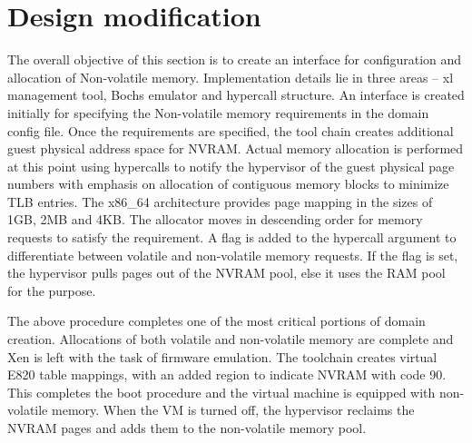 \section{Design modification}
The overall objective of this section is to create an interface for configuration and allocation of Non-volatile memory. Implementation details lie in three areas – xl management tool, Bochs emulator and hypercall structure. An interface is created initially for specifying the Non-volatile memory requirements in the domain config file. Once the requirements are specified, the tool chain creates additional guest physical address space for NVRAM. Actual memory allocation is performed at this point using hypercalls to notify the hypervisor of the guest physical page numbers with emphasis on allocation of contiguous memory blocks to minimize TLB entries. The x86\_64 architecture provides page mapping in the sizes of 1GB, 2MB and 4KB. The allocator moves in descending order for memory requests to satisfy the requirement. A flag is added to the hypercall argument to differentiate between volatile and non-volatile memory requests. If the flag is set, the hypervisor pulls pages out of the NVRAM pool, else it uses the RAM pool for the purpose. 

 

The above procedure completes one of the most critical portions of domain creation. Allocations of both volatile and non-volatile memory are complete and Xen is left with the task of firmware emulation. The toolchain creates virtual E820 table mappings, with an added region to indicate NVRAM with code 90. This completes the boot procedure and the virtual machine is equipped with non-volatile memory. When the VM is turned off, the hypervisor reclaims the NVRAM pages and adds them to the non-volatile memory pool.


